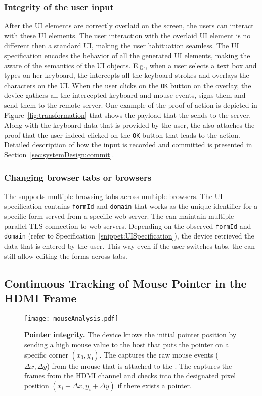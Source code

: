 \subsubsection{Integrity of the user input} After the UI elements are correctly overlaid on the screen, the users can interact with these UI elements. The user interaction with the overlaid UI element is no different then a standard UI, making the user habituation seamless. The UI specification encodes the behavior of all the generated UI elements, making the \device aware of the semantics of the UI objects. E.g., when a user selects a text box and types on her keyboard, the \device intercepts all the keyboard strokes and overlays the characters on the UI. When the user clicks on the \texttt{OK} button on the overlay, the device gathers all the intercepted keyboard and mouse events, signs them and send them to the remote server. One example of the proof-of-action is depicted in Figure~\ref{fig:transformation} that shows the payload that the \device sends to the server. Along with the keyboard data that is provided by the user, the \device also attaches the proof that the user indeed clicked on the \texttt{OK} button that leads to the action. Detailed description of how the input is recorded and committed is presented in Section~\ref{sec:systemDesign:commit}.


\subsubsection{Changing browser tabs or browsers}
The \device supports multiple browsing tabs across multiple browsers. The UI specification contains \texttt{formId} and \texttt{domain} that works as the unique identifier for a specific form served from a specific web server. The \device can maintain multiple parallel TLS connection to web servers. Depending on the observed \texttt{formId} and \texttt{domain} (refer to Specification~\ref{snippet:UISpecification}), the device retrieved the data that is entered by the user. This way even if the user switches tabs, the \device can still allow editing the forms across tabs. 


\subsection{Continuous Tracking of Mouse Pointer in the HDMI Frame}
\label{sec:systemDesign:analysis}


\begin{figure}[t]
\centering
\texttt{[image: mouseAnalysis.pdf]}
\caption{\textbf{Pointer integrity.} The device knows the initial pointer position by sending a high mouse value to the host that puts the pointer on a specific corner $(x_0, y_0)$. \one The \device captures the raw mouse events ($\Delta x, \Delta y$) from the mouse that is attached to the \device. \two The \device captures the frames from the HDMI channel and checks into the designated pixel position $(x_i + \Delta x, y_i + \Delta y)$ if there exists a pointer.}
\label{fig:mouseAnalysis}
\centering
\end{figure}


